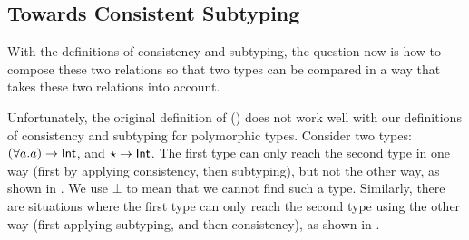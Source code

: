 \subsection{Towards Consistent Subtyping}
\label{subsec:towards-conssub}

With the definitions of consistency and subtyping, the question now is how to
compose these two relations so that two types can be compared in a way that takes
these two relations into account.

Unfortunately, the original definition of \citet{siek2007gradual}
() does not work well with our definitions of
consistency and subtyping for polymorphic types. Consider two types: $(\forall
a. a) \to \mathsf{Int}$, and $\star \to \mathsf{Int}$. The first type can only reach the
second type in one way (first by applying consistency, then subtyping), but not the
other way, as shown in . We use $\bot$ to mean that we
cannot find such a type. Similarly, there are situations where the first type
can only reach the second type using the other way (first applying
subtyping, and then
consistency), as shown in .


